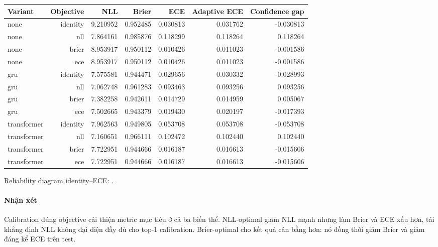 \begin{table}[!htbp]
\centering
\scriptsize
\setlength{\tabcolsep}{2.5pt}
\begin{adjustbox}{max width=\textwidth}
\begin{tabular}{@{}lrrrrrr@{}}
\toprule
Variant & Objective & NLL & Brier & ECE & Adaptive ECE & Confidence gap \\
\midrule
none & identity & 9.210952 & 0.952485 & 0.030813 & 0.031762 & -0.030813 \\
none & nll & 7.864161 & 0.985876 & 0.118299 & 0.118264 & 0.118264 \\
none & brier & 8.953917 & 0.950112 & 0.010426 & 0.011023 & -0.001586 \\
none & ece & 8.953917 & 0.950112 & 0.010426 & 0.011023 & -0.001586 \\
gru & identity & 7.575581 & 0.944471 & 0.029656 & 0.030332 & -0.028993 \\
gru & nll & 7.062748 & 0.961283 & 0.093463 & 0.093256 & 0.093256 \\
gru & brier & 7.382258 & 0.942611 & 0.014729 & 0.014959 & 0.005067 \\
gru & ece & 7.502665 & 0.943379 & 0.019430 & 0.020197 & -0.017393 \\
transformer & identity & 7.962563 & 0.949805 & 0.053708 & 0.053708 & -0.053708 \\
transformer & nll & 7.160651 & 0.966111 & 0.102472 & 0.102440 & 0.102440 \\
transformer & brier & 7.722951 & 0.944666 & 0.016187 & 0.016613 & -0.015606 \\
transformer & ece & 7.722951 & 0.944666 & 0.016187 & 0.016613 & -0.015606 \\
\bottomrule
\end{tabular}
\end{adjustbox}
\end{table}

Reliability diagram identity--ECE: .

\paragraph{Nhận xét}

Calibration đúng objective cải thiện metric mục tiêu ở cả ba biến thể. NLL-optimal giảm NLL mạnh nhưng làm Brier và ECE xấu hơn, tái khẳng định NLL không đại diện đầy đủ cho top-1 calibration. Brier-optimal cho kết quả cân bằng hơn: nó đồng thời giảm Brier và giảm đáng kể ECE trên test.

